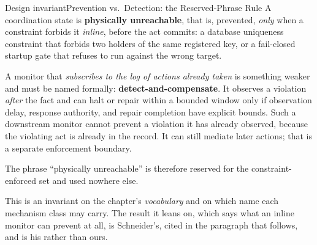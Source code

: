\documentclass[11pt,a4paper]{article}
\theoremstyle{definition}
\theoremstyle{plain}
\begin{document}
\begin{pdclaim}{Design invariant}{Prevention vs.\ Detection: the Reserved-Phrase Rule}
\setlength{\parskip}{4pt plus 1pt}
\label{prop:regiment}
A coordination state is \textbf{physically unreachable}, that is, prevented, \emph{only}
when a constraint forbids it \emph{inline}, before the act commits: a database
uniqueness constraint that forbids two holders of the same registered key, or a fail-closed startup
gate that refuses to run against the wrong target.

A monitor that \emph{subscribes to
the log of actions already taken} is something weaker and must be named formally:
\mbox{\textbf{detect-and-compensate}}. It observes a violation \emph{after} the fact and
can halt or repair within a bounded window only if observation delay, response authority, and repair completion have explicit bounds. Such a downstream monitor
cannot prevent a violation it has already observed, because the violating act is
already in the record. It can still mediate later actions; that is a separate enforcement boundary.

The phrase ``physically
unreachable'' is therefore reserved for the constraint-enforced set and used nowhere else.

This is an invariant on the chapter's \emph{vocabulary} and on which name each
mechanism class may carry. The result it leans on, which says what an inline
monitor can prevent at all, is Schneider's, cited in the paragraph that follows,
and is his rather than ours.
\end{pdclaim}
\end{document}
